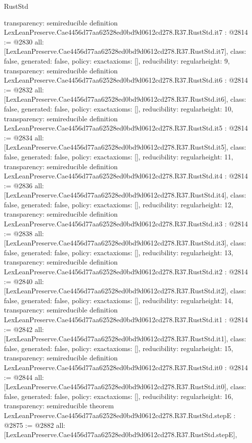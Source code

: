 \begin{lexlean}{RustStd}
\begin{coremodule}
{  transparency: semireducible
}
definition LexLeanPreserve.Cae4456d77aa62528ed0bd9d0612cd278.R37.RustStd.it7 : @2814 := @2830 {
  all: [LexLeanPreserve.Cae4456d77aa62528ed0bd9d0612cd278.R37.RustStd.it7],
  class: false,
  generated: false,
  policy: exact{axioms: []},
  reducibility: regular{height: 9},
  transparency: semireducible
}
definition LexLeanPreserve.Cae4456d77aa62528ed0bd9d0612cd278.R37.RustStd.it6 : @2814 := @2832 {
  all: [LexLeanPreserve.Cae4456d77aa62528ed0bd9d0612cd278.R37.RustStd.it6],
  class: false,
  generated: false,
  policy: exact{axioms: []},
  reducibility: regular{height: 10},
  transparency: semireducible
}
definition LexLeanPreserve.Cae4456d77aa62528ed0bd9d0612cd278.R37.RustStd.it5 : @2814 := @2834 {
  all: [LexLeanPreserve.Cae4456d77aa62528ed0bd9d0612cd278.R37.RustStd.it5],
  class: false,
  generated: false,
  policy: exact{axioms: []},
  reducibility: regular{height: 11},
  transparency: semireducible
}
definition LexLeanPreserve.Cae4456d77aa62528ed0bd9d0612cd278.R37.RustStd.it4 : @2814 := @2836 {
  all: [LexLeanPreserve.Cae4456d77aa62528ed0bd9d0612cd278.R37.RustStd.it4],
  class: false,
  generated: false,
  policy: exact{axioms: []},
  reducibility: regular{height: 12},
  transparency: semireducible
}
definition LexLeanPreserve.Cae4456d77aa62528ed0bd9d0612cd278.R37.RustStd.it3 : @2814 := @2838 {
  all: [LexLeanPreserve.Cae4456d77aa62528ed0bd9d0612cd278.R37.RustStd.it3],
  class: false,
  generated: false,
  policy: exact{axioms: []},
  reducibility: regular{height: 13},
  transparency: semireducible
}
definition LexLeanPreserve.Cae4456d77aa62528ed0bd9d0612cd278.R37.RustStd.it2 : @2814 := @2840 {
  all: [LexLeanPreserve.Cae4456d77aa62528ed0bd9d0612cd278.R37.RustStd.it2],
  class: false,
  generated: false,
  policy: exact{axioms: []},
  reducibility: regular{height: 14},
  transparency: semireducible
}
definition LexLeanPreserve.Cae4456d77aa62528ed0bd9d0612cd278.R37.RustStd.it1 : @2814 := @2842 {
  all: [LexLeanPreserve.Cae4456d77aa62528ed0bd9d0612cd278.R37.RustStd.it1],
  class: false,
  generated: false,
  policy: exact{axioms: []},
  reducibility: regular{height: 15},
  transparency: semireducible
}
definition LexLeanPreserve.Cae4456d77aa62528ed0bd9d0612cd278.R37.RustStd.it0 : @2814 := @2844 {
  all: [LexLeanPreserve.Cae4456d77aa62528ed0bd9d0612cd278.R37.RustStd.it0],
  class: false,
  generated: false,
  policy: exact{axioms: []},
  reducibility: regular{height: 16},
  transparency: semireducible
}
theorem LexLeanPreserve.Cae4456d77aa62528ed0bd9d0612cd278.R37.RustStd.stepE : @2875 := @2882 {
  all: [LexLeanPreserve.Cae4456d77aa62528ed0bd9d0612cd278.R37.RustStd.stepE],
}
\end{coremodule}
\end{lexlean}
